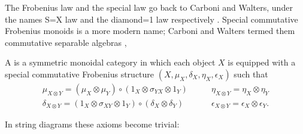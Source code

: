 The Frobenius law and the special law go back to Carboni and Walters, under the
names S=X law and the diamond=1 law respectively \cite{CW}. Special commutative
Frobenius monoids is a more modern name; Carboni and Walters termed them
commutative separable algebras \cite{RSW}, 

\begin{definition}
  A  is a symmetric monoidal category in which each
  object $X$ is equipped with a special commutative Frobenius structure
  $(X,\mu_X,\delta_X,\eta_X,\epsilon_X)$ such that 
\[
  \begin{array}{cc}
    \mu_{X\otimes Y} = (\mu_X \otimes \mu_Y)\circ(1_X \otimes \sigma_{YX}\otimes
    1_Y) \qquad&
    \eta_{X\otimes Y} = \eta_X \otimes \eta_Y \\
    \delta_{X\otimes Y} = (1_X \otimes \sigma_{XY}\otimes 1_Y)\circ(\delta_X
    \otimes \delta_Y) \qquad&
    \epsilon_{X\otimes Y} = \epsilon_X \otimes \epsilon_Y.
  \end{array}
\]
\end{definition}
In string diagrams these axioms become trivial:
